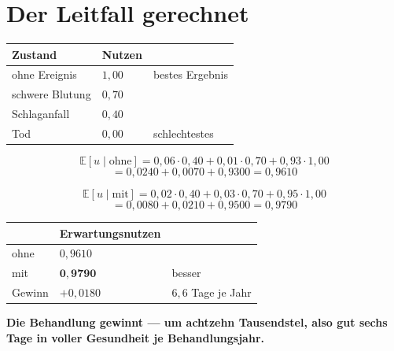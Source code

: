 \section{Der Leitfall gerechnet}

\begin{merksatz}
\begin{center}
{\small
\renewcommand{\arraystretch}{1.5}
\begin{tabular}{@{}P{3.2cm}P{2.0cm}P{2.6cm}@{}}
\toprule
\textbf{Zustand} & \textbf{Nutzen} & \\
\midrule
ohne Ereignis & $1{,}00$ & bestes Ergebnis\\
schwere Blutung & $0{,}70$ & \\
Schlaganfall & $0{,}40$ & \\
Tod & $0{,}00$ & schlechtestes\\
\bottomrule
\end{tabular}}
\end{center}

\[ \mathbb{E}[u \mid \text{ohne}] = 0{,}06\cdot0{,}40 + 0{,}01\cdot0{,}70 + 0{,}93\cdot1{,}00 \]
\[ = 0{,}0240 + 0{,}0070 + 0{,}9300 = 0{,}9610 \]

\[ \mathbb{E}[u \mid \text{mit}] = 0{,}02\cdot0{,}40 + 0{,}03\cdot0{,}70 + 0{,}95\cdot1{,}00 \]
\[ = 0{,}0080 + 0{,}0210 + 0{,}9500 = 0{,}9790 \]

\begin{center}
{\small
\renewcommand{\arraystretch}{1.5}
\begin{tabular}{@{}P{2.4cm}P{2.8cm}P{2.2cm}@{}}
\toprule
& \textbf{Erwartungs\-nutzen} & \\
\midrule
ohne & $0{,}9610$ & \\
mit & $\mathbf{0{,}9790}$ & \textcolor{gruen}{besser}\\
\midrule
Gewinn & $+0{,}0180$ & $6{,}6$ Tage je Jahr\\
\bottomrule
\end{tabular}}
\end{center}

\begin{center}
\begin{minipage}{0.9\textwidth}
\textbf{Die Behandlung gewinnt --- um achtzehn Tausendstel, also gut sechs Tage in voller Gesundheit je Behandlungsjahr.}
\end{minipage}
\end{center}

\begin{center}
\begin{minipage}{0.88\textwidth}
\end{minipage}
\end{center}
\end{merksatz}

